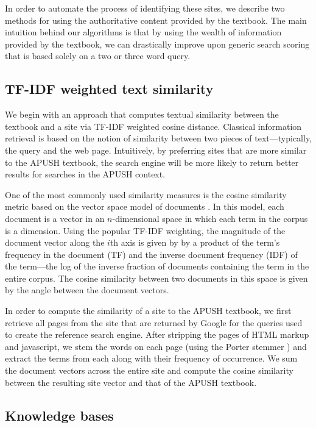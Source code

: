 \documentclass[pdfpagelabels=false,plainpages=true]{acm_proc_article-sp}
\begin{document}
In order to automate the process of identifying these sites, we describe two
methods for using the authoritative content provided by the textbook. The main
intuition behind our algorithms is that by using the wealth of information
provided by the textbook, we can drastically improve upon generic search scoring
that is based solely on a two or three word query. 

\subsection{TF-IDF weighted text similarity}

We begin with an
approach that computes textual similarity between the textbook and a site via
TF-IDF weighted cosine distance. Classical 
information retrieval is based on the notion of similarity between two 
pieces of text---typically, the query and the web page.  Intuitively, by
preferring sites that are more similar to the APUSH textbook, the search engine
will be more likely to return better results for searches in the APUSH context.  

One of the most commonly used similarity measures is the cosine similarity
metric based on the vector space model of documents \cite{salton1975vector}. In
this model, each document is a vector in an $n$-dimensional space in which each
term in the corpus is a dimension. Using the popular TF-IDF weighting, the
magnitude of the document vector along the $i$th axis is given by by a product
of the term's frequency in the document (TF) and the inverse document frequency
(IDF) of the term---the log of the inverse fraction of documents containing the term in the
entire corpus. The cosine similarity between two documents in this space is
given by the angle between the document vectors.

In order to compute the similarity of a site to the APUSH textbook, we first
retrieve all pages from the site that are returned by Google for the queries
used to create the reference search engine. After stripping the pages of HTML
markup and javascript, we stem the words on each page (using the Porter stemmer 
\cite{porter1980algorithm}) and extract the terms from each along with their
frequency of occurrence. We sum the document vectors across the entire site and
compute the cosine similarity between the resulting site vector and that of
the APUSH textbook.

\subsection{Knowledge bases}
\end{document}
